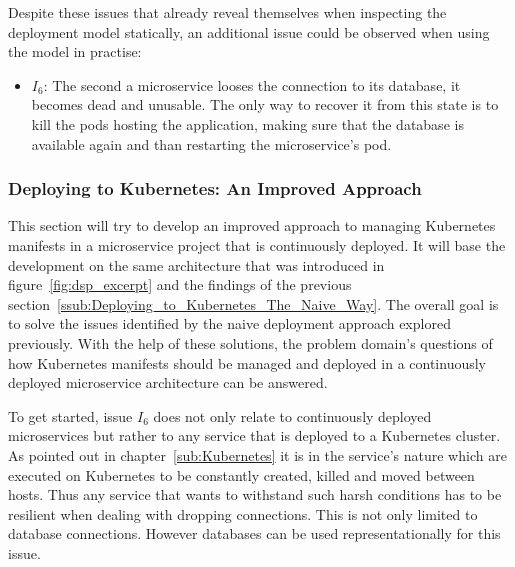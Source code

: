 Despite these issues that already reveal themselves when inspecting the
deployment model statically, an additional issue could be observed when using
the model in practise:

\begin{itemize}
  \item \textit{$I_6$}: The second a microservice looses the connection to its
    database, it becomes dead and unusable. The only way to recover it from
    this state is to kill the pods hosting the application, making sure that
    the database is available again and than restarting the microservice's pod.
\end{itemize}

\subsubsection{Deploying to Kubernetes: An Improved Approach}%
\label{ssub:Deploying_to_Kubernetes_An_Improved_Approach}

This section will try to develop an improved approach to managing Kubernetes
manifests in a microservice project that is continuously deployed. It will base
the development on the same architecture that was introduced in
figure~\ref{fig:dsp_excerpt} and the findings of the previous
section~\ref{ssub:Deploying_to_Kubernetes_The_Naive_Way}. The overall goal is
to solve the issues identified by the naive deployment approach explored
previously. With the help of these solutions, the problem domain's questions of
how Kubernetes manifests should be managed and deployed in a continuously
deployed microservice architecture can be answered.

To get started, issue $I_6$ does not only relate to continuously deployed
microservices but rather to any service that is deployed to a Kubernetes
cluster. As pointed out in chapter~\ref{sub:Kubernetes} it is in the service's
nature which are executed on Kubernetes to be constantly created, killed and
moved between hosts. Thus any service that wants to withstand such harsh
conditions has to be resilient when dealing with dropping connections. This is
not only limited to database connections. However databases can be used
representationally for this issue.

